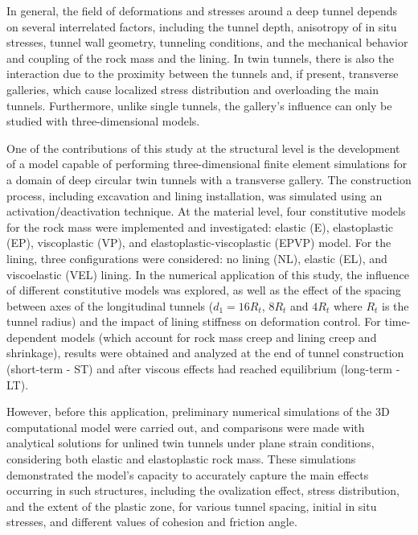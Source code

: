 \documentclass[a4paper,fleqn]{cas-sc}
\begin{document}
In general, the field of deformations and stresses around a deep tunnel depends on several interrelated factors, including the tunnel depth, anisotropy of in situ stresses, tunnel wall geometry, tunneling conditions, and the mechanical behavior and coupling of the rock mass and the lining. In twin tunnels, there is also the interaction due to the proximity between the tunnels and, if present, transverse galleries, which cause localized stress distribution and overloading the main tunnels. Furthermore, unlike single tunnels, the gallery's influence can only be studied with three-dimensional models.

One of the contributions of this study at the structural level is the development of a model capable of performing three-dimensional finite element simulations for a domain of deep circular twin tunnels with a transverse gallery. The construction process, including excavation and lining installation, was simulated using an activation/deactivation technique. At the material level, four constitutive models for the rock mass were implemented and investigated: elastic (E), elastoplastic (EP), viscoplastic (VP), and elastoplastic-viscoplastic (EPVP) model. For the lining, three configurations were considered: no lining (NL), elastic (EL), and viscoelastic (VEL) lining. In the numerical application of this study, the influence of different constitutive models was explored, as well as the effect of the spacing between axes of the longitudinal tunnels ($d_1 = 16R_t$, $8R_t$ and $4R_t$ where $R_t$ is the tunnel radius) and the impact of lining stiffness on deformation control. For time-dependent models (which account for rock mass creep and lining creep and shrinkage), results were obtained and analyzed at the end of tunnel construction (short-term - ST) and after viscous effects had reached equilibrium (long-term - LT).

However, before this application, preliminary numerical simulations of the 3D computational model were carried out, and comparisons were made with analytical solutions for unlined twin tunnels under plane strain conditions, considering both elastic and elastoplastic rock mass. These simulations demonstrated the model's capacity to accurately capture the main effects occurring in such structures, including the ovalization effect, stress distribution, and the extent of the plastic zone, for various tunnel spacing, initial in situ stresses, and different values of cohesion and friction angle.
\end{document}
